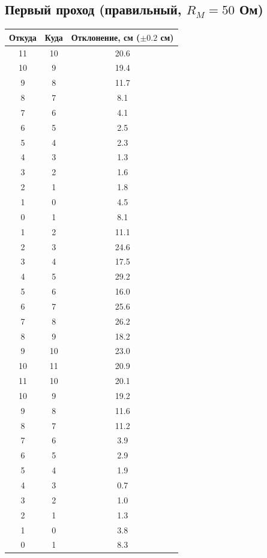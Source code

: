 \documentclass[a4paper]{article}
\begin{document}
	\subsection{Первый проход (правильный, $R_M = 50$ Ом)}
	
	\begin{longtable}{|c|c|c|}
		\hline
		Откуда & Куда & Отклонение, см ($\pm 0.2$ см) \\
		\hline
		11 & 10 & 20.6 \\ \hline
		10 & 9 & 19.4 \\ \hline
		9 & 8 & 11.7 \\ \hline
		8 & 7 & 8.1 \\ \hline
		7 & 6 & 4.1 \\ \hline
		6 & 5 & 2.5 \\ \hline
		5 & 4 & 2.3 \\ \hline
		4 & 3 & 1.3 \\ \hline
		3 & 2 & 1.6 \\ \hline
		2 & 1 & 1.8 \\ \hline
		1 & 0 & 4.5 \\ \hline
		0 & 1 & 8.1 \\ \hline
		1 & 2 & 11.1 \\ \hline
		2 & 3 & 24.6 \\ \hline
		3 & 4 & 17.5 \\ \hline
		4 & 5 & 29.2 \\ \hline
		5 & 6 & 16.0 \\ \hline
		6 & 7 & 25.6 \\ \hline
		7 & 8 & 26.2 \\ \hline
		8 & 9 & 18.2 \\ \hline
		9 & 10 & 23.0 \\ \hline
		10 & 11 & 20.9 \\ \hline
		11 & 10 & 20.1 \\ \hline
		10 & 9 & 19.2 \\ \hline
		9 & 8 & 11.6 \\ \hline
		8 & 7 & 11.2 \\ \hline
		7 & 6 & 3.9 \\ \hline
		6 & 5 & 2.9 \\ \hline
		5 & 4 & 1.9 \\ \hline
		4 & 3 & 0.7 \\ \hline
		3 & 2 & 1.0 \\ \hline
		2 & 1 & 1.3 \\ \hline
		1 & 0 & 3.8 \\ \hline
		0 & 1 & 8.3 \\ \hline

\end{longtable}
\end{document}
